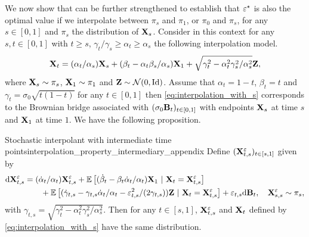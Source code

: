 \documentclass{article}
\begin{document}
We now show that  can be further strengthened to establish that $\varepsilon^\star$ is also the optimal value if we interpolate between $\pi_s$ and $\pi_1$, or $\pi_0$ and $\pi_s$, for any $s \in [0,1]$ and $\pi_s$ the distribution of $\mathbf{X}_s$. Consider in this context for any $s, t \in [0,1]$ with $t \geq s$, $\gamma_t / \gamma_s \geq \alpha_t \geq \alpha_s$ the following interpolation model.
\begin{equation}
\label{eq:interpolation_with_s}
    \bfX_t = (\alpha_t/\alpha_s) \bfX_s + (\beta_t - \alpha_t \beta_s /\alpha_s) \bfX_1 + \sqrt{\gamma^2_t - \alpha_t^2 \gamma^2_s / \alpha_s^2} \bfZ ,
\end{equation}
where $\mathbf{X}_s \sim \pi_s$, $\mathbf{X}_1 \sim \pi_1$ and $\mathbf{Z} \sim \mathcal{N}(0, \mathrm{Id})$. Assume that $\alpha_t = 1-t$, $\beta_t = t$ and $\gamma_t = \sigma_0 \sqrt{t (1-t)}$ for any $t \in [0,1]$ then \eqref{eq:interpolation_with_s} corresponds to the Brownian bridge associated with $(\sigma_0 \mathbf{B}_t)_{t \in [0,1]}$ with endpoints $\mathbf{X}_s$ at time $s$ and $\mathbf{X}_1$ at time $1$.
We have the following proposition. 
\begin{proposition}{Stochastic interpolant with intermediate time points}{interpolation_property_intermediary_appendix}
Define $(\mathbf{X}_{t,s}^\varepsilon)_{t\in [s,1]}$ given by 
\begin{align}
\label{eq:stochastic_flow_rewrite_appendix}
    \rmd \bfX_{t,s}^\vareps &= (\dot{\alpha}_t/\alpha_t) \bfX_{t,s}^\vareps + \mathbb{E}\left[(\dot{\beta}_t - \beta_t \dot{\alpha}_t / \alpha_t) \bfX_1 \ | \ \bfX_t = \bfX_{t,s}^\vareps\right] \\
    & \qquad + \mathbb{E}\left[(\dot{\gamma}_{t,s} - \gamma_{t,s} \dot{\alpha}_t/\alpha_t -  \vareps_{t,s}^2 /(2\gamma_{t,s})) \bfZ \ | \ \bfX_t = \bfX_{t,s}^\vareps\right] + \vareps_{t,s} \rmd \bfB_t , \quad \bfX_{s,s}^\vareps \sim \pi_s ,
\end{align}
with $\gamma_{t,s} = \sqrt{\gamma_t^2 - \alpha_t^2 \gamma_s^2 / \alpha_s^2}$. Then for any $t  \in [s,1]$, $\mathbf{X}_{t,s}^\varepsilon$ and $\mathbf{X}_t$ defined by \eqref{eq:interpolation_with_s} have the same distribution.
\end{proposition}
\end{document}
